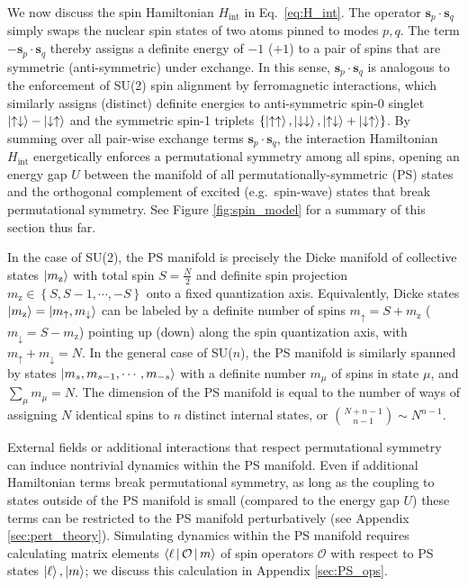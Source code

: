 \documentclass[nofootinbib,twocolumn]{revtex4-2}
\renewcommand{\t}{\text} %
\renewcommand{\set}[1]{\left\{#1\right\}} %
\newcommand{\bk}{\Braket} %
\renewcommand{\v}{\bm} %
\renewcommand{\c}{\cdot} %
\newcommand{\1}{\mathds{1}}
\newcommand{\up}{\uparrow}
\newcommand{\dn}{\downarrow}
\newcommand{\z}{\text{z}}
\renewcommand{\O}{\mathcal{O}}
\begin{document}
We now discuss the spin Hamiltonian $H_{\t{int}}$ in Eq.~\eqref{eq:H_int}.
The operator $\v s_p\c\v s_q$ simply swaps the nuclear spin states of two atoms pinned to modes $p,q$.
The term $-\v s_p\c\v s_q$ thereby assigns a definite energy of $-1$ ($+1$) to a pair of spins that are symmetric (anti-symmetric) under exchange.
In this sense, $\v s_p\c\v s_q$ is analogous to the enforcement of SU(2) spin alignment by ferromagnetic interactions, which similarly assigns (distinct) definite energies to anti-symmetric spin-0 singlet $\ket{\up\dn}-\ket{\dn\up}$ and the symmetric spin-1 triplets $\set{\ket{\up\up},\ket{\dn\dn},\ket{\up\dn}+\ket{\dn\up}}$.
By summing over all pair-wise exchange terms $\v s_p\c\v s_q$, the interaction Hamiltonian $H_{\t{int}}$ energetically enforces a permutational symmetry among all spins, opening an energy gap $U$ between the manifold of all permutationally-symmetric (PS) states and the orthogonal complement of excited (e.g.~spin-wave) states that break permutational symmetry.
See Figure \ref{fig:spin_model} for a summary of this section thus far.

In the case of SU(2), the PS manifold is precisely the Dicke manifold of collective states $\ket{m_\z}$ with total spin $S=\frac{N}{2}$ and definite spin projection $m_\z\in\set{S,S-1,\cdots,-S}$ onto a fixed quantization axis.
Equivalently, Dicke states $\ket{m_\z}=\ket{m_\up,m_\dn}$ can be labeled by a definite number of spins $m_\up=S+m_\z$ ($m_\dn=S-m_\z$) pointing up (down) along the spin quantization axis, with $m_\up+m_\dn=N$.
In the general case of SU($n$), the PS manifold is similarly spanned by states $\ket{m_s,m_{s-1},\cdots,m_{-s}}$ with a definite number $m_\mu$ of spins in state $\mu$, and $\sum_\mu m_\mu=N$.
The dimension of the PS manifold is equal to the number of ways of assigning $N$ identical spins to $n$ distinct internal states, or ${N+n-1 \choose n-1} \sim N^{n-1}$.

External fields or additional interactions that respect permutational symmetry can induce nontrivial dynamics within the PS manifold.
Even if additional Hamiltonian terms break permutational symmetry, as long as the coupling to states outside of the PS manifold is small (compared to the energy gap $U$) these terms can be restricted to the PS manifold perturbatively (see Appendix \ref{sec:pert_theory}).
Simulating dynamics within the PS manifold requires calculating matrix elements $\bk{\ell|\O|m}$ of spin operators $\O$ with respect to PS states $\ket\ell,\ket{m}$; we discuss this calculation in Appendix \ref{sec:PS_ops}.
\end{document}
